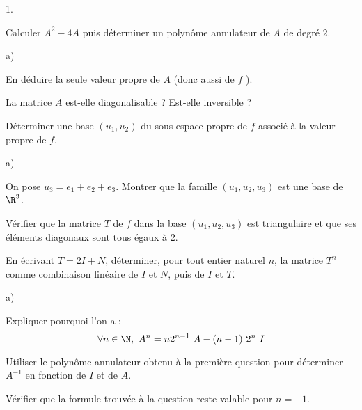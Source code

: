 \begin{noliste}{1.}
  \setlength{\itemsep}{4mm}
\item Calculer $A^{2}-4A$ puis déterminer un polynôme annulateur de
  $A$ de degré $2$.

  

\item
  \begin{noliste}{a)}
    \setlength{\itemsep}{2mm}
  \item En déduire la seule valeur propre de $A$ (donc aussi de $f$ ).

    		

  \item La matrice $A$ est-elle diagonalisable ? Est-elle inversible ?
  \end{noliste}

    		

\item Déterminer une base $(u_{1},u_{2})$ du sous-espace propre de $f$
  associé à la valeur propre de $f$.

  

\item 
  \begin{noliste}{a)}
    \setlength{\itemsep}{2mm}
  \item On pose $u_{3} = e_{1} + e_{2} + e_{3}$. Montrer que la
    famille $(u_{1},u_{2},u_{3})$ est une base de $\R^{3}$.

    		




  \item Vérifier que la matrice $T$ de $f$ dans la base
    $(u_{1},u_{2},u_{3})$ est triangulaire et que ses éléments
    diagonaux sont tous égaux à 2.

    

  \item En écrivant $T = 2I + N$, déterminer, pour tout entier naturel
    $n$, la matrice $T^{n}$ comme combinaison linéaire de $I$ et $N$,
    puis de $I$ et $T$.

    
  \end{noliste}




\item
  \begin{noliste}{a)}
    \setlength{\itemsep}{2mm}
  \item Expliquer pourquoi l'on a :
    \[
    \forall n\in\N, \ A^{n} = n2^{n-1} \ A - (n-1) \ 2^{n} \ I
    \]

    
    
  \item Utiliser le polynôme annulateur obtenu à la première question
    pour déterminer $A^{-1}$ en fonction de $I$ et de $A$.

    

  \item Vérifier que la formule trouvée à la question  reste
    valable pour $n = -1$.

    
  \end{noliste}
\end{noliste}


